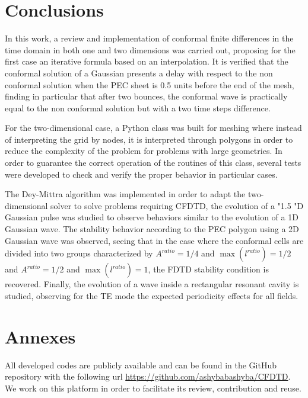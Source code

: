 \documentclass[12pt, oneside]{book}
\begin{document}
\chapter{Conclusions}

In this work, a review and implementation of conformal finite differences in the time domain in both one and two dimensions was carried out, proposing for the first case an iterative formula based on an interpolation. It is verified that the conformal solution of a Gaussian presents a delay with respect to the non conformal solution when the PEC sheet is 0.5 units before the end of the mesh, finding in particular that after two bounces, the conformal wave is practically equal to the non conformal solution but with a two time steps difference.

For the two-dimensional case, a Python class was built for meshing where instead of interpreting the grid by nodes, it is interpreted through polygons in order to reduce the complexity of the problem for problems with large geometries. In order to guarantee the correct operation of the routines of this class, several tests were developed to check and verify the proper behavior in particular cases.

The Dey-Mittra algorithm was implemented in order to adapt the two-dimensional solver to solve problems requiring CFDTD, the evolution of a "1.5 "D Gaussian pulse was studied to observe behaviors similar to the evolution of a 1D Gaussian wave. The stability behavior according to the PEC polygon using a 2D Gaussian wave was observed, seeing that in the case where the conformal cells are divided into two groups characterized by $A^{ratio} = 1/4$ and $\max({l^{ratio}}) = 1/2$ and $A^{ratio} = 1/2$ and $\max({l^{ratio}}) = 1$, the FDTD stability condition is recovered. Finally, the evolution of a wave inside a rectangular resonant cavity is studied, observing for the TE mode the expected periodicity effects for all fields. 

\chapter{Annexes}

All developed codes are publicly available and can be found in the GitHub repository with the following url \url{https://github.com/ashybabashyba/CFDTD}. We work on this platform in order to facilitate its review, contribution and reuse.

\end{document}
